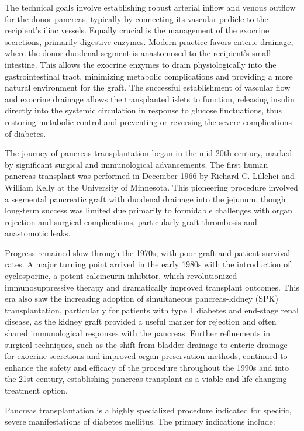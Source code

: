 The technical goals involve establishing robust arterial inflow and venous outflow for the donor pancreas, typically by connecting its vascular pedicle to the recipient's iliac vessels. Equally crucial is the management of the exocrine secretions, primarily digestive enzymes. Modern practice favors enteric drainage, where the donor duodenal segment is anastomosed to the recipient's small intestine. This allows the exocrine enzymes to drain physiologically into the gastrointestinal tract, minimizing metabolic complications and providing a more natural environment for the graft. The successful establishment of vascular flow and exocrine drainage allows the transplanted islets to function, releasing insulin directly into the systemic circulation in response to glucose fluctuations, thus restoring metabolic control and preventing or reversing the severe complications of diabetes.

The journey of pancreas transplantation began in the mid-20th century, marked by significant surgical and immunological advancements. The first human pancreas transplant was performed in December 1966 by Richard C. Lillehei and William Kelly at the University of Minnesota. This pioneering procedure involved a segmental pancreatic graft with duodenal drainage into the jejunum, though long-term success was limited due primarily to formidable challenges with organ rejection and surgical complications, particularly graft thrombosis and anastomotic leaks.

Progress remained slow through the 1970s, with poor graft and patient survival rates. A major turning point arrived in the early 1980s with the introduction of cyclosporine, a potent calcineurin inhibitor, which revolutionized immunosuppressive therapy and dramatically improved transplant outcomes. This era also saw the increasing adoption of simultaneous pancreas-kidney (SPK) transplantation, particularly for patients with type 1 diabetes and end-stage renal disease, as the kidney graft provided a useful marker for rejection and often shared immunological responses with the pancreas. Further refinements in surgical techniques, such as the shift from bladder drainage to enteric drainage for exocrine secretions and improved organ preservation methods, continued to enhance the safety and efficacy of the procedure throughout the 1990s and into the 21st century, establishing pancreas transplant as a viable and life-changing treatment option.

Pancreas transplantation is a highly specialized procedure indicated for specific, severe manifestations of diabetes mellitus. The primary indications include:

